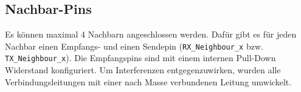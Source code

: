 \subsection{Nachbar-Pins}
Es können maximal 4 Nachbarn angeschlossen werden. Dafür gibt es für jeden Nachbar einen Empfangs- und einen Sendepin (\texttt{RX\_Neighbour\_x} bzw. \texttt{TX\_Neighbour\_x}). Die Empfangspins sind mit einem internen Pull-Down Widerstand konfiguriert. Um Interferenzen entgegenzuwirken, wurden alle Verbindungsleitungen mit einer nach Masse verbundenen Leitung umwickelt.